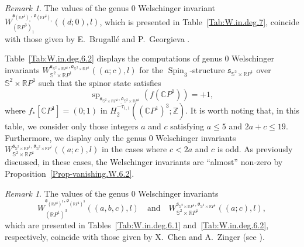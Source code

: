 \documentclass[11pt]{amsart}
\numberwithin{equation}{section}
\theoremstyle{definition}
\theoremstyle{plain}
\theoremstyle{remark}
\newtheorem{remark}[definition]{Remark}
\newcommand{\R}{\mathbb{R}}
\newcommand{\Z}{\mathbb{Z}}
\newcommand{\C}{\mathbb{C}}
\DeclareMathOperator{\Spin}{Spin}
\renewcommand{\sp}{\operatorname{sp}}
\begin{document}
   
\begin{remark}
The values of the genus $0$ Welschinger invariant $W_{(\R P^3)_1}^{\mathfrak{s}_{(\R P^3)_1},\mathfrak{o}_{(\R P^3)_1}}((d;0),l)$, which is presented in Table~\ref{Tab:W.in.deg.7}, coincide with those given by E.~Brugall\'e and P.~Georgieva \cite{brugalle2016pencils}.  
\end{remark}

Table~\ref{Tab:W.in.deg.6.2} displays the computations of  genus $0$ Welschinger invariants $ W_{\mathbb{S}^2 \times \R P^1}^{\mathfrak{s}_{\mathbb{S}^2 \times \R P^1},\mathfrak{o}_{\mathbb{S}^2 \times \R P^1}}((a;c),l)$ for the $\Spin_3$-structure $\mathfrak{s}_{\mathbb{S}^2 \times \R P^1}$ over $\mathbb{S}^2\times \R P^1$   such that the spinor state satisfies 
$$\sp_{\mathfrak{s}_{\mathbb{S}^2 \times \R P^1},\mathfrak{o}_{\mathbb{S}^2 \times \R P^1}}\left(f\left(\C P^1\right)\right)=+1,$$
where $f_*[\C P^1]=(0;1)$ in $H_2^{-\tilde{\tau}_{1,1}}((\C P^1)^3;\Z)$.  It is worth noting that, in this table, we consider only those integers $a$ and $c$ satisfying $a\leq 5$ and $2a+c \leq 19$. Furthermore, we display only the genus $0$ Welschinger invariants $ W_{\mathbb{S}^2 \times \R P^1}^{\mathfrak{s}_{\mathbb{S}^2 \times \R P^1},\mathfrak{o}_{\mathbb{S}^2 \times \R P^1}}((a;c),l)$ in the cases where $c<2a$ and $c$ is odd. As previously discussed,  in these cases, the Welschinger invariants are ``almost'' non-zero by Proposition~\ref{Prop-vanishing.W.6.2}.

 \begin{remark}
The values of the genus $0$ Welschinger invariants
$$W_{(\R P^1)^3}^{\mathfrak{s}_{(\R P^1)^3},\mathfrak{o}_{(\R P^1)^3}}((a,b,c),l) \quad\text{and}\quad   W_{\mathbb{S}^2\times \R P^1}^{\mathfrak{s}_{\mathbb{S}^2\times \R P^1},\mathfrak{o}_{\mathbb{S}^2\times \R P^1}}((a;c),l),$$ which are presented in Tables~\ref{Tab:W.in.deg.6.1} and~\ref{Tab:W.in.deg.6.2}, respectively, coincide with those given by X.~Chen and A.~Zinger (see \cite{chen2021wdvv}).
\end{remark}
\newpage
\end{document}
